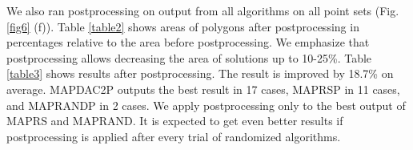 \documentclass[conference]{IEEEtran}
\begin{document}
		We also ran postprocessing on output from all algorithms on all point sets (Fig. \ref{fig6} (f)).
		Table \ref{table2} shows areas of polygons after postprocessing in percentages relative to the area before postprocessing.
		We emphasize that postprocessing allows decreasing the area of solutions up to 10-25\%.
		Table \ref{table3} shows results after postprocessing.
		The result is improved by 18.7\% on average.
		MAP{\textunderscore}DAC2{\textunderscore}P outputs the best result in 17 cases, MAP{\textunderscore}RS{\textunderscore}P in 11 cases, and MAP{\textunderscore}RAND{\textunderscore}P in 2 cases.
		We apply postprocessing only to the best output of MAP{\textunderscore}RS and MAP{\textunderscore}RAND.
		It is expected to get even better results if postprocessing is applied after every trial of randomized algorithms.
		
\end{document}
